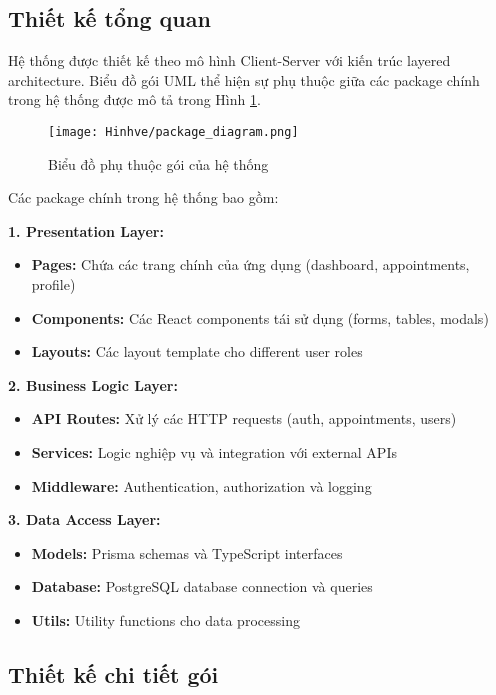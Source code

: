 \documentclass[../DoAn.tex]{subfiles}
\begin{document}
\subsection{Thiết kế tổng quan}

Hệ thống được thiết kế theo mô hình Client-Server với kiến trúc layered architecture. Biểu đồ gói UML thể hiện sự phụ thuộc giữa các package chính trong hệ thống được mô tả trong Hình \ref{fig:package_diagram}.

\begin{figure}[H]
    \centering
    \texttt{[image: Hinhve/package\_diagram.png]}
    \caption{Biểu đồ phụ thuộc gói của hệ thống}
    \label{fig:package_diagram}
\end{figure}

Các package chính trong hệ thống bao gồm:

\textbf{1. Presentation Layer:}
\begin{itemize}
    \item \textbf{Pages:} Chứa các trang chính của ứng dụng (dashboard, appointments, profile)
    \item \textbf{Components:} Các React components tái sử dụng (forms, tables, modals)
    \item \textbf{Layouts:} Các layout template cho different user roles
\end{itemize}

\textbf{2. Business Logic Layer:}
\begin{itemize}
    \item \textbf{API Routes:} Xử lý các HTTP requests (auth, appointments, users)
    \item \textbf{Services:} Logic nghiệp vụ và integration với external APIs
    \item \textbf{Middleware:} Authentication, authorization và logging
\end{itemize}

\textbf{3. Data Access Layer:}
\begin{itemize}
    \item \textbf{Models:} Prisma schemas và TypeScript interfaces
    \item \textbf{Database:} PostgreSQL database connection và queries
    \item \textbf{Utils:} Utility functions cho data processing
\end{itemize}

\subsection{Thiết kế chi tiết gói}
\end{document}
